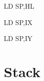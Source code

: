 \documentclass[12pt,twoside,openright,a4paper]{book}
\begin{document}
\begin{instrtable}
	\begin{instruction}{LD SP,HL} 
			\FlagsLDrr
	\end{instruction}
	
	\begin{instruction}{LD SP,IX} 
			\FlagsLDrr
		\SkipToOpCode 
	\end{instruction}
	
	\begin{lastinstruction}{LD SP,IY} 
			\FlagsLDrr
		\SkipToOpCode 
	\end{lastinstruction}
		
\end{instrtable}


\section{Stack}
\end{document}
